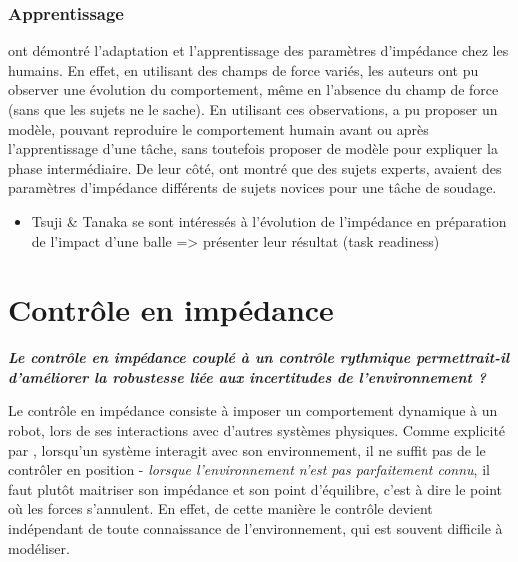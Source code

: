 \documentclass[12pt, a4paper]{article} %
\begin{document}
\subsubsection{Apprentissage}
\cite{burdet_central_2001} ont démontré l'adaptation et l'apprentissage des paramètres d'impédance chez les humains. En effet, en utilisant des champs de force variés, les auteurs ont pu observer une évolution du comportement, même en l'absence du champ de force (sans que les sujets ne le sache). En utilisant ces observations, \cite{tee_model_2004} a pu proposer un modèle, pouvant reproduire le comportement humain avant ou après l'apprentissage d'une tâche, sans toutefois proposer de modèle pour expliquer la phase intermédiaire. De leur côté, \cite{erden_hand_2015} ont montré que des sujets experts, avaient des paramètres d'impédance différents de sujets novices pour une tâche de soudage.

\begin{itemize}
	\item Tsuji \& Tanaka se sont intéressés à l'évolution de l'impédance en préparation de l'impact d'une balle => présenter leur résultat (task readiness)
\end{itemize}



\section{Contrôle en impédance}

\begin{flushright}
{\color{DarkGoldenrod}\textit{\textbf{Le contrôle en impédance couplé à un contrôle rythmique permettrait-il d'améliorer la robustesse liée aux incertitudes de l'environnement ?}}}
\end{flushright}

Le contrôle en impédance consiste à imposer un comportement dynamique à un robot, lors de ses interactions avec d'autres systèmes physiques. Comme explicité par \cite{hogan_impedance_1985, colgate_robust_1988}, lorsqu'un système interagit avec son environnement, il ne suffit pas de le contrôler en position - \textit{lorsque l'environnement n'est pas parfaitement connu}, il faut plutôt maitriser son impédance et son point d'équilibre, c'est à dire le point où les forces s'annulent. En effet, de cette manière le contrôle devient indépendant de toute connaissance de l'environnement, qui est souvent difficile à modéliser.
\end{document}
